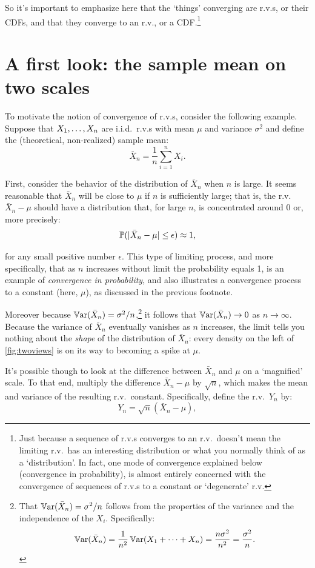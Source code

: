 So it's important to emphasize here that the `things' converging are r.v.s, or their CDFs, and that they converge to an r.v., or a CDF.\footnote{Just because a sequence of r.v.s converges to an r.v.\ doesn't mean the limiting r.v.\ has an interesting distribution or what you normally think of as a `distribution'.
In fact, one mode of convergence explained below (convergence in probability), is almost entirely concerned with the convergence of sequences of r.v.s to a constant or `degenerate' r.v.}

\section{A first look: the sample mean on two scales}
\label{sec:conv-two-scales}

To motivate the notion of convergence of r.v.s, consider the following example.
Suppose that $X_1, \ldots, X_n$ are i.i.d.\ r.v.s with mean $\mu$ and variance $\sigma^2$ and define the (theoretical, non-realized) sample mean:
\[
\bar{X}_n = \frac{1}{n} \sum_{i=1}^n X_i.
\]

First, consider the behavior of the distribution of $\bar{X}_n$ when $n$ is large.
It seems reasonable that $\bar{X}_n$ will be close to $\mu$ if $n$ is sufficiently large;
that is, the r.v.\ $\bar{X}_n - \mu$ should have a distribution that, for large $n$, is concentrated around 0 or, more precisely:
\[
\mathbb{P}(\lvert\bar{X}_n - \mu\rvert \leq \epsilon) \approx 1,
\]

for any small positive number $\epsilon$.
This type of limiting process, and more specifically, that as $n$ increases without limit the probability equals 1, is an example of \textit{convergence in probability}, and also illustrates a convergence process to a constant (here, $\mu$), as discussed in the previous footnote.

Moreover because $\operatorname*{\mathbb{V}\text{ar}}( \bar{X}_n ) = \sigma^2/n$,\footnote{That $\operatorname*{\mathbb{V}\text{ar}}( \bar{X}_n ) = \sigma^2/n$ follows from the properties of the variance and the independence of the $X_i$.
Specifically:
\[
\operatorname*{\mathbb{V}\text{ar}}(\bar{X}_n) = \frac{1}{n^2} \operatorname*{\mathbb{V}\text{ar}}(X_1 + \cdots + X_n) = \frac{n \sigma^2}{n^2} = \frac{\sigma^2}{n}.
\]} it follows that $\operatorname*{\mathbb{V}\text{ar}}( \bar{X}_n ) \to 0$ as $n \to \infty$.
Because the variance of $\bar{X}_n$ eventually vanishes as $n$ increases, the limit tells you nothing about the \textit{shape} of the distribution of $\bar{X}_n$: every density on the left of \cref{fig:twoviews} is on its way to becoming a spike at $\mu$.

It's possible though to look at the difference between $\bar{X}_n$ and $\mu$ on a `magnified' scale.
To that end, multiply the difference $\bar{X}_n - \mu$ by $\sqrt{n}$, which makes the mean and variance of the resulting r.v.\ constant.
Specifically, define the r.v.\ $Y_n$ by:
\[
Y_n = \sqrt{n}(\bar{X}_n - \mu),
\]

